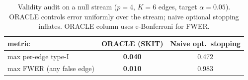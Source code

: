 \begin{table}[htbp]
\centering
\caption{Validity audit on a null stream ($p=4$, $K=6$ edges, target $\alpha=0.05$). ORACLE controls error uniformly over the stream; naive optional stopping inflates. ORACLE column uses e-Bonferroni for FWER.}
\label{tab:validity}
\begin{tabular}{lcc}
\hline
metric & ORACLE (SKIT) & Naive opt.\ stopping \\
\hline
max per-edge type-I & \textbf{0.040} & 0.472 \\
max FWER (any false edge) & \textbf{0.010} & 0.983 \\
\hline
\end{tabular}
\end{table}
